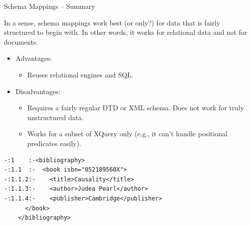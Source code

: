 \begin{frame}{Schema Mappings -- Summary}

In a sense, schema mappings work best (or only?) for data that is fairly structured to begin with. In other words, it works for relational data and not for documents.

\begin{itemize}[-]
\item Advantages:
\begin{itemize}[-]
\item Reuses relational engines and SQL.
\end{itemize}
\item Disadvantages:
\begin{itemize}[-]
\item Requires a fairly regular DTD or XML schema. Does not work for truly unstructured data.
\item Works for a subset of XQuery only (e.g., it can't handle positional predicates easily).
\end{itemize}
\end{itemize}
\end{frame}


\newsavebox\mappingExampleBiblio
\begin{lrbox}{\mappingExampleBiblio}
\begin{lstlisting}[style=markup]
-:1    :-<bibliography>
-:1.1  :-  <book isbn="052189560X">
-:1.1.2:-    <title>Causality</title>
-:1.1.3:-    <author>Judea Pearl</author>
-:1.1.4:-    <publisher>Cambridge</publisher>
      </book>
    </bibliography>
\end{lstlisting}
\end{lrbox}

\newsavebox{\mappingExampleDatabase}



